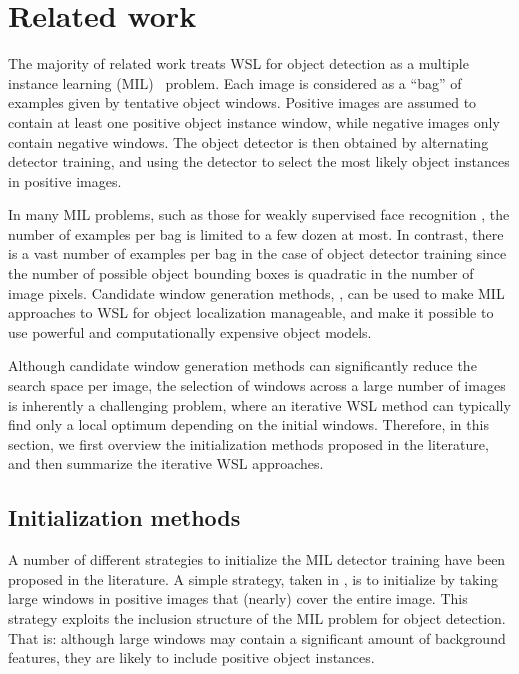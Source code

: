 \documentclass[10pt,journal,cspaper,final,twocolumn,compsoc]{./IEEEtran}
\begin{document}
\section{Related work}\label{sec:related}

The majority of related work treats WSL for object
detection as a multiple instance learning
(MIL)~\cite{dietterich97ai} problem. Each image is
considered as a ``bag'' of examples given by tentative
object windows. Positive images are assumed to contain at
least one positive object instance window, while negative
images only contain negative windows. The object detector
is then obtained by alternating detector training, and
using the detector to select the most likely object
instances in positive images. 

In many MIL problems, \eg such as those for weakly
supervised face recognition
\cite{berg04cvpr,everingham09ivc}, the number of examples
per bag is limited to a few dozen at most.  In contrast,
there is a vast number of examples per bag in the case of
object detector training since the number of possible
object bounding boxes is quadratic in the number of image
pixels. Candidate window generation methods, \eg\cite{alexe10cvpr,gu12eccv,uijlings13ijcv,zitnick14eccv}, can be
used to make MIL approaches to WSL for object localization manageable, and make it
possible to use powerful and computationally
expensive  object models. 

Although candidate window generation methods can
significantly reduce the search space per image, the
selection of windows across a large number of images is
inherently a challenging problem, where an iterative WSL
method can typically find only a local optimum depending
on the initial windows. Therefore, in 
this section, we first overview the
initialization methods proposed in the literature, and
then summarize the iterative WSL approaches.

\subsection{Initialization methods}

A number of different strategies to initialize the MIL
detector training have been proposed in the literature.  A
simple strategy,  \eg  taken in
\cite{pandey11iccv,russakovsky12eccv,kim09nips}, is to initialize
by taking large windows in positive images that (nearly)
cover the entire image. This strategy exploits the
inclusion structure of the MIL problem for object
detection. That is:  although large windows may contain a
significant amount of background features, they are likely
to include positive object instances.
\end{document}
